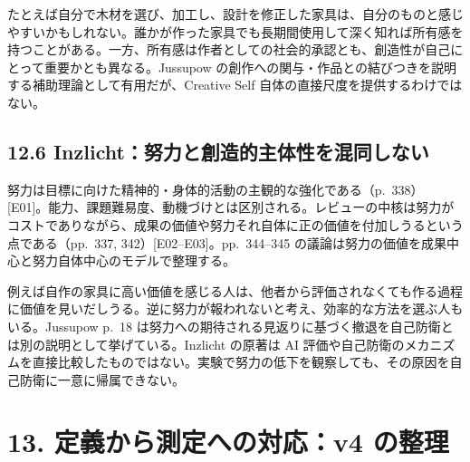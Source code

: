 \documentclass[
  11pt,
  a4paper,
]{article}
\begin{document}
たとえば自分で木材を選び、加工し、設計を修正した家具は、自分のものと感じやすいかもしれない。誰かが作った家具でも長期間使用して深く知れば所有感を持つことがある。一方、所有感は作者としての社会的承認とも、創造性が自己にとって重要かとも異なる。Jussupow
の創作への関与・作品との結びつきを説明する補助理論として有用だが、Creative
Self 自体の直接尺度を提供するわけではない。

\subsection{12.6
Inzlicht：努力と創造的主体性を混同しない}\label{inzlichtux52aaux529bux3068ux5275ux9020ux7684ux4e3bux4f53ux6027ux3092ux6df7ux540cux3057ux306aux3044}

努力は目標に向けた精神的・身体的活動の主観的な強化である（p.~338）{[}E01{]}。能力、課題難易度、動機づけとは区別される。レビューの中核は努力がコストでありながら、成果の価値や努力それ自体に正の価値を付加しうるという点である（pp.~337,
342）{[}E02--E03{]}。pp.~344--345
の議論は努力の価値を成果中心と努力自体中心のモデルで整理する。

例えば自作の家具に高い価値を感じる人は、他者から評価されなくても作る過程に価値を見いだしうる。逆に努力が報われないと考え、効率的な方法を選ぶ人もいる。Jussupow
p.~18
は努力への期待される見返りに基づく撤退を自己防衛とは別の説明として挙げている。Inzlicht
の原著は AI
評価や自己防衛のメカニズムを直接比較したものではない。実験で努力の低下を観察しても、その原因を自己防衛に一意に帰属できない。

\section{13. 定義から測定への対応：v4
の整理}\label{ux5b9aux7fa9ux304bux3089ux6e2cux5b9aux3078ux306eux5bfeux5fdcv4-ux306eux6574ux7406}
\end{document}
